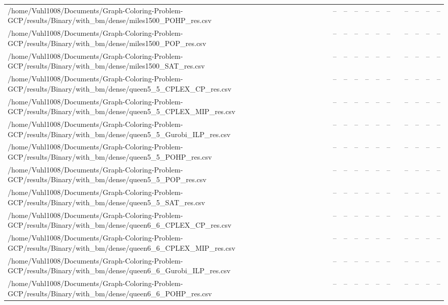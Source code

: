 \begin{table}[htbp]
\begin{tabular}{llllllllllll}
/home/Vuhl1008/Documents/Graph-Coloring-Problem-GCP/results/Binary/with\_bm/dense/miles1500\_POHP\_res.csv & -- & -- & -- & -- & -- & -- & {} & -- & -- & -- & -- \\
/home/Vuhl1008/Documents/Graph-Coloring-Problem-GCP/results/Binary/with\_bm/dense/miles1500\_POP\_res.csv & -- & -- & -- & -- & -- & -- & {} & -- & -- & -- & -- \\
/home/Vuhl1008/Documents/Graph-Coloring-Problem-GCP/results/Binary/with\_bm/dense/miles1500\_SAT\_res.csv & -- & -- & -- & -- & -- & -- & {} & -- & -- & -- & -- \\
/home/Vuhl1008/Documents/Graph-Coloring-Problem-GCP/results/Binary/with\_bm/dense/queen5\_5\_CPLEX\_CP\_res.csv & -- & -- & -- & -- & -- & -- & {} & -- & -- & -- & -- \\
/home/Vuhl1008/Documents/Graph-Coloring-Problem-GCP/results/Binary/with\_bm/dense/queen5\_5\_CPLEX\_MIP\_res.csv & -- & -- & -- & -- & -- & -- & {} & -- & -- & -- & -- \\
/home/Vuhl1008/Documents/Graph-Coloring-Problem-GCP/results/Binary/with\_bm/dense/queen5\_5\_Gurobi\_ILP\_res.csv & -- & -- & -- & -- & -- & -- & {} & -- & -- & -- & -- \\
/home/Vuhl1008/Documents/Graph-Coloring-Problem-GCP/results/Binary/with\_bm/dense/queen5\_5\_POHP\_res.csv & -- & -- & -- & -- & -- & -- & {} & -- & -- & -- & -- \\
/home/Vuhl1008/Documents/Graph-Coloring-Problem-GCP/results/Binary/with\_bm/dense/queen5\_5\_POP\_res.csv & -- & -- & -- & -- & -- & -- & {} & -- & -- & -- & -- \\
/home/Vuhl1008/Documents/Graph-Coloring-Problem-GCP/results/Binary/with\_bm/dense/queen5\_5\_SAT\_res.csv & -- & -- & -- & -- & -- & -- & {} & -- & -- & -- & -- \\
/home/Vuhl1008/Documents/Graph-Coloring-Problem-GCP/results/Binary/with\_bm/dense/queen6\_6\_CPLEX\_CP\_res.csv & -- & -- & -- & -- & -- & -- & {} & -- & -- & -- & -- \\
/home/Vuhl1008/Documents/Graph-Coloring-Problem-GCP/results/Binary/with\_bm/dense/queen6\_6\_CPLEX\_MIP\_res.csv & -- & -- & -- & -- & -- & -- & {} & -- & -- & -- & -- \\
/home/Vuhl1008/Documents/Graph-Coloring-Problem-GCP/results/Binary/with\_bm/dense/queen6\_6\_Gurobi\_ILP\_res.csv & -- & -- & -- & -- & -- & -- & {} & -- & -- & -- & -- \\
/home/Vuhl1008/Documents/Graph-Coloring-Problem-GCP/results/Binary/with\_bm/dense/queen6\_6\_POHP\_res.csv & -- & -- & -- & -- & -- & -- & {} & -- & -- & -- & -- \\

\end{tabular}
\end{table}
